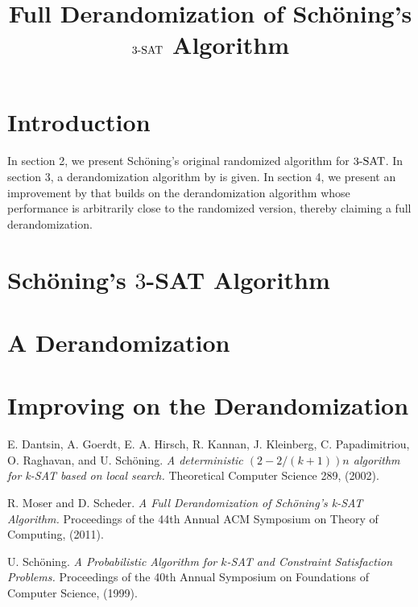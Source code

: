 \documentclass{article}
\title{Full Derandomization of Sch\"{o}ning's $\SAT$ Algorithm}
\author{}
\date{}
\newcommand{\SAT}{\textnormal{$3$-SAT}}
\begin{document}
\maketitle

\section{Introduction}
\paragraph{} In section 2, we present Sch\"{o}ning's original randomized algorithm\cite{Schoning99} for $\SAT$. In section 3, a derandomization algorithm by \cite{Dantsin02} is given. In section 4, we present an improvement by \cite{Moser11} that builds on the derandomization algorithm whose performance is arbitrarily close to the randomized version, thereby claiming a full derandomization.

\section{Sch\"{o}ning's $3$-SAT Algorithm\cite{Schoning99}}



\section{A Derandomization}

\section{Improving on the Derandomization}

\begin{thebibliography}{9}
E. Dantsin, A. Goerdt, E. A. Hirsch, R. Kannan, J. Kleinberg, C. Papadimitriou, O. Raghavan, and U. Sch\"{o}ning. 
\textit{A deterministic $(2-2/(k+1))n$ algorithm for k-SAT based on local search.} Theoretical Computer Science 289, (2002).

R. Moser and D. Scheder.
\textit{A Full Derandomization of Sch\"{o}ning’s k-SAT Algorithm.} Proceedings of the 44th Annual ACM Symposium on Theory of Computing, (2011).

U. Sch\"{o}ning.
\textit{A Probabilistic Algorithm for $k$-SAT and Constraint Satisfaction Problems.} Proceedings of the 40th Annual Symposium on Foundations of Computer Science, (1999).

\end{thebibliography}
\end{document}
